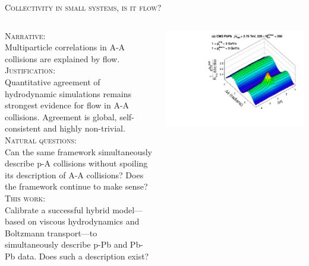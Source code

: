 \documentclass[aspectratio=169]{beamer}
\begin{document}
\begin{frame}{\scshape Collectivity in small systems, is it flow?}
  \smallskip
  \begin{columns}[T]
    \begin{column}{.7\textwidth}
      \medskip \small
      \textcolor{theme}{\scshape Narrative:}\\[.5ex]
      Multiparticle correlations in A-A collisions are explained by flow.\\[1ex]
      \textcolor{theme}{\scshape Justification:}\\[.5ex]
      Quantitative agreement of hydrodynamic simulations remains strongest evidence for flow in A-A collisions. Agreement is global, self-consistent and highly non-trivial.\\[1ex]
      \textcolor{theme}{\scshape Natural questions:}\\[.5ex]
      Can the same framework simultaneously describe p-A collisions without spoiling its description of A-A collisions? Does the framework continue to make sense?\\[1ex]
      \textcolor{theme}{\scshape This work:}\\[.5ex]
      Calibrate a successful hybrid model---based on viscous hydrodynamics and Boltzmann transport---to simultaneously describe p-Pb and Pb-Pb data. Does such a description exist?
    \end{column}
    \begin{column}{.3\textwidth}
      \centering
      \includegraphics[width=\columnwidth]{pbpb_corr2d}\\

\end{column}
\end{columns}
\end{frame}
\end{document}
